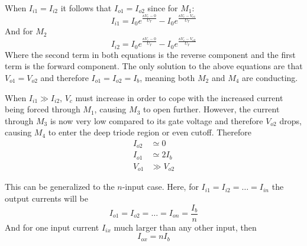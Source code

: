 When \(I_{i1}=I_{i2}\) it follows that \(I_{o1}=I_{o2}\) since for \(M_1\):
\begin{equation*}
    I_{i1} = I_0e^{\frac{\kappa V_c - 0}{U_T}}-I_0e^{\frac{\kappa V_c - V_{o1}}{U_T}}
\end{equation*}
And for \(M_2\)
\begin{equation*}
    I_{i2} = I_0e^{\frac{\kappa V_c - 0}{U_T}}-I_0e^{\frac{\kappa V_c - V_{o2}}{U_T}}
\end{equation*}
Where the second term in both equations is the reverse component and the first term is the forward component.
The only solution to the above equations are that \(V_{o1}=V_{o2}\) and therefore \(I_{o1}=I_{o2}=I_b\), 
meaning both \(M_2\) and \(M_4\) are conducting.

When \(I_{i1} \gg I_{i2}\), \(V_c\) must increase in order to cope with the increased current being forced through \(M_1\), causing
\(M_3\) to open further. However, the current through \(M_3\) is now very low compared to its gate voltage and therefore \(V_{o2}\) drops,
causing \(M_4\) to enter the deep triode region or even cutoff. Therefore 
\begin{align*}
    I_{o2} &\simeq 0 \\
    I_{o1} &\simeq 2I_b \\
    V_{o1} &\gg V_{o2} 
\end{align*}

This can be generalized to the \(n\)-input case. Here, for \(I_{i1}=I_{i2}=\ldots=I_{in}\) the output currents will be
\begin{equation*}
    I_{o1}=I_{o2}=\ldots=I_{on}=\frac{I_b}{n}
\end{equation*}
And for one input current \(I_{ix}\) much larger than any other input, then 
\begin{equation*}
    I_{ox} = nI_b
\end{equation*}


